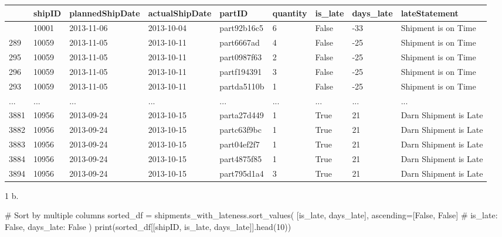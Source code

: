 \documentclass[
  letterpaper,
  DIV=11,
  numbers=noendperiod]{scrartcl}
\newenvironment{Shaded}{\begin{snugshade}}{\end{snugshade}}
\newcommand{\BuiltInTok}[1]{\textcolor[rgb]{0.00,0.23,0.31}{#1}}
\newcommand{\CommentTok}[1]{\textcolor[rgb]{0.37,0.37,0.37}{#1}}
\newcommand{\DecValTok}[1]{\textcolor[rgb]{0.68,0.00,0.00}{#1}}
\newcommand{\NormalTok}[1]{\textcolor[rgb]{0.00,0.23,0.31}{#1}}
\newcommand{\OperatorTok}[1]{\textcolor[rgb]{0.37,0.37,0.37}{#1}}
\newcommand{\StringTok}[1]{\textcolor[rgb]{0.13,0.47,0.30}{#1}}
\newcommand{\VariableTok}[1]{\textcolor[rgb]{0.07,0.07,0.07}{#1}}
\begin{document}
\begin{longtable}[]{@{}lllllllll@{}}
\toprule\noalign{}
& shipID & plannedShipDate & actualShipDate & partID & quantity &
is\_late & days\_late & lateStatement \\
\midrule\noalign{}
\endhead
\bottomrule\noalign{}
\endlastfoot
0 & 10001 & 2013-11-06 & 2013-10-04 & part92b16c5 & 6 & False & -33 &
Shipment is on Time \\
289 & 10059 & 2013-11-05 & 2013-10-11 & part6667ad & 4 & False & -25 &
Shipment is on Time \\
295 & 10059 & 2013-11-05 & 2013-10-11 & part0987f63 & 2 & False & -25 &
Shipment is on Time \\
296 & 10059 & 2013-11-05 & 2013-10-11 & partf194391 & 3 & False & -25 &
Shipment is on Time \\
293 & 10059 & 2013-11-05 & 2013-10-11 & partda5110b & 1 & False & -25 &
Shipment is on Time \\
... & ... & ... & ... & ... & ... & ... & ... & ... \\
3881 & 10956 & 2013-09-24 & 2013-10-15 & parta27d449 & 1 & True & 21 &
Darn Shipment is Late \\
3882 & 10956 & 2013-09-24 & 2013-10-15 & partc63f9bc & 1 & True & 21 &
Darn Shipment is Late \\
3883 & 10956 & 2013-09-24 & 2013-10-15 & part04ef2f7 & 1 & True & 21 &
Darn Shipment is Late \\
3884 & 10956 & 2013-09-24 & 2013-10-15 & part4875f85 & 1 & True & 21 &
Darn Shipment is Late \\
3894 & 10956 & 2013-09-24 & 2013-10-15 & part795d1a4 & 3 & True & 21 &
Darn Shipment is Late \\
\end{longtable}

1 b.

\begin{Shaded}
\begin{Highlighting}[]
\CommentTok{\# Sort by multiple columns}
\NormalTok{sorted\_df }\OperatorTok{=}\NormalTok{ shipments\_with\_lateness.sort\_values(}
\NormalTok{    [}\StringTok{\textquotesingle{}is\_late\textquotesingle{}}\NormalTok{, }\StringTok{\textquotesingle{}days\_late\textquotesingle{}}\NormalTok{], }
\NormalTok{    ascending}\OperatorTok{=}\NormalTok{[}\VariableTok{False}\NormalTok{, }\VariableTok{False}\NormalTok{]  }\CommentTok{\# is\_late: False, days\_late: False}
\NormalTok{)}
\BuiltInTok{print}\NormalTok{(sorted\_df[[}\StringTok{\textquotesingle{}shipID\textquotesingle{}}\NormalTok{, }\StringTok{\textquotesingle{}is\_late\textquotesingle{}}\NormalTok{, }\StringTok{\textquotesingle{}days\_late\textquotesingle{}}\NormalTok{]].head(}\DecValTok{10}\NormalTok{))}
\end{Highlighting}
\end{Shaded}
\end{document}
